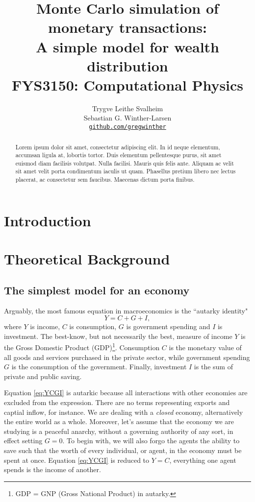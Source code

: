 \documentclass[10pt, a4paper]{amsart}
\title[Simulation of monetary transactions]{Monte Carlo simulation of monetary transactions: \\
\normalsize{A simple model for wealth distribution} \\
  \hrulefill\small{ FYS3150: Computational Physics }\hrulefill}
\author[Svalheim \& Winther-Larsen]{Trygve Leithe Svalheim \\
   Sebastian G. Winther-Larsen \\
  \href{https://github.com/gregwinther/FYS3150/}{\texttt{github.com/gregwinther}}}
\begin{document}
\begin{titlepage}
\begin{abstract}
Lorem ipsum dolor sit amet, consectetur adipiscing elit. In id neque elementum, accumsan ligula at, lobortis tortor. Duis elementum pellentesque purus, sit amet euismod diam facilisis volutpat. Nulla facilisi. Mauris quis felis ante. Aliquam ac velit sit amet velit porta condimentum iaculis ut quam. Phasellus pretium libero nec lectus placerat, ac consectetur sem faucibus. Maecenas dictum porta finibus.
\end{abstract}
\maketitle
\tableofcontents
\end{titlepage}

\section{Introduction}


\section{Theoretical Background}
\subsection{The simplest model for an economy}
Arguably, the most famous equation in macroeconomics is the ``autarky identity"
\begin{equation}
\label{eq:YCGI}
Y = C + G + I,
\end{equation}
where $Y$ is income, $C$ is consumption, $G$ is government spending and $I$ is investment. The best-know, but not necessarily the best, measure of income $Y$ is the Gross Domestic Product (GDP)\footnote{GDP = GNP (Gross National Product) in autarky.}. Consumption $C$ is the monetary value of all goods and services purchased in the private sector, while government spending $G$ is the consumption of the government. Finally, investment $I$ is the sum of private and public saving. 

Equation \ref{eq:YCGI} is autarkic because all interactions with other economies are excluded from the expression. There are no terms representing exports and captial inflow, for instance. We are dealing with a \emph{closed} economy, alternatively the entire world as a whole. Moreover, let's assume that the economy we are studying is a peaceful anarchy, without a governing authority of any sort, in effect setting $G = 0$. To begin with, we will also forgo the agents the ability to save such that the worth of every individual, or agent, in the economy must be spent at once. Equation \ref{eq:YCGI} is reduced to $Y = C$, everything one agent spends is the income of another.
\end{document}
